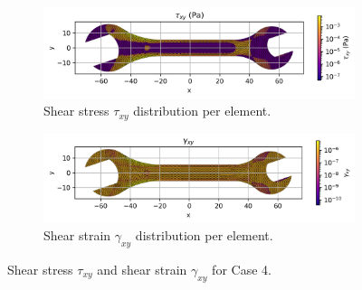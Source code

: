 \begin{figure}[H]
    \centering
    \begin{subfigure}[t]{0.49\textwidth}
        \centering
        \includegraphics[width=\textwidth]{GRAFICOS/Case d - tau_xy_per_element.png}
        \caption{Shear stress $\tau_{xy}$ distribution per element.}
        \label{fig:tau_xy_d}
    \end{subfigure}
    \hfill
    \begin{subfigure}[t]{0.49\textwidth}
        \centering
        \includegraphics[width=\textwidth]{GRAFICOS/Case d - gamma_xy_per_element.png}
        \caption{Shear strain $\gamma_{xy}$ distribution per element.}
        \label{fig:gamma_xy_d}
    \end{subfigure}
    \caption{Shear stress $\tau_{xy}$ and shear strain $\gamma_{xy}$ for Case 4.}
    \label{fig:shear_fields_d}
\end{figure}

